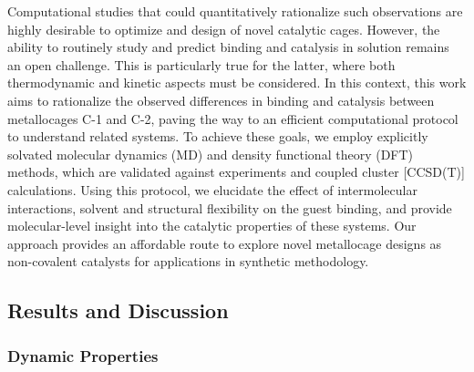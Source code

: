 \documentclass[../../main.tex]{subfiles}
\begin{document}
Computational studies that could quantitatively rationalize such observations are highly desirable to optimize and design of novel catalytic cages. However, the ability to routinely study and predict binding and catalysis in solution remains an open challenge. This is particularly true for the latter, where both thermodynamic and kinetic aspects must be considered. In this context, this work aims to rationalize the observed differences in binding and catalysis between metallocages C-1 and C-2, paving the way to an efficient computational protocol to understand related systems. To achieve these goals, we employ explicitly solvated molecular dynamics (MD) and density functional theory (DFT) methods, which are validated against experiments and coupled cluster [CCSD(T)] calculations. Using this protocol, we elucidate the effect of intermolecular interactions, solvent and structural flexibility on the guest binding, and provide molecular-level insight into the catalytic properties of these systems. Our approach provides an affordable route to explore novel metallocage designs as non-covalent catalysts for applications in synthetic methodology.

\subsection{Results and Discussion}

\subsubsection{Dynamic Properties} 
\end{document}
